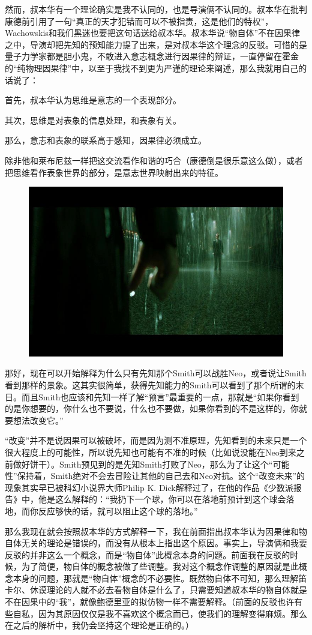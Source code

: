 \documentclass[UTF8]{ctexart}
\begin{document}
然而，叔本华有一个理论确实是我不认同的，也是导演俩不认同的。叔本华在批判康德前引用了一句“真正的天才犯错而可以不被指责，这是他们的特权”，Wachowskis和我们黑迷也要把这句话送给叔本华。叔本华说“物自体”不在因果律之中，导演却把先知的预知能力提了出来，是对叔本华这个理念的反驳。可惜的是量子力学家都是胆小鬼，不敢进入意志概念进行因果律的辩证，一直停留在霍金的“纯物理因果律”中，以至于我找不到更为严谨的理论来阐述，那么我就用自己的话说了：

首先，叔本华认为思维是意志的一个表现部分。

其次，思维是对表象的信息处理，和表象有关。

那么，意志和表象的联系高于感知，因果律必须成立。

除非他和莱布尼兹一样把这交流看作和谐的巧合（康德倒是很乐意这么做），或者把思维看作表象世界的部分，是意志世界映射出来的特征。

\begin{figure}[htb]
\centering
\includegraphics[width=0.5\linewidth]{fig/bbbfa2ccb58aa91101e928d3.jpg}
\end{figure}

那好，现在可以开始解释为什么只有先知那个Smith可以战胜Neo，或者说让Smith看到那样的景象。这其实很简单，获得先知能力的Smith可以看到了那个所谓的末日。而且Smith也应该和先知一样了解“预言”最重要的一点，那就是“如果你看到的是你想要的，你什么也不要说，什么也不要做，如果你看到的不是这样的，你就要想法改变它。”

“改变”并不是说因果可以被破坏，而是因为测不准原理，先知看到的未来只是一个很大程度上的可能性，所以说先知也可能有不准的时候（比如说没能在Neo到来之前做好饼干）。Smith预见到的是先知Smith打败了Neo，那么为了让这个“可能性”保持着，Smith绝对不会去冒险让其他的自己去和Neo对抗。这个“改变未来”的现象其实早已被科幻小说界大师Philip K. Dick解释过了，在他的作品《少数派报告》中，他是这么解释的：“我扔下一个球，你可以在落地前预计到这个球会落地，而你反应够快的话，就可以阻止这个球的落地。”

那么我现在就会按照叔本华的方式解释一下，我在前面指出叔本华认为因果律和物自体无关的理论是错误的，而没有从根本上指出这个原因。事实上，导演俩和我要反驳的并非这么一个概念，而是“物自体”此概念本身的问题。前面我在反驳的时候，为了简便，物自体的概念被做了些调整。我对这个概念作调整的原因就是此概念本身的问题，那就是“物自体”概念的不必要性。既然物自体不可知，那么理解笛卡尔、休谟理论的人就不必去看物自体是什么了，只需要知道叔本华的物自体就是不在因果中的“我”，就像鲍德里亚的拟仿物一样不需要解释。（前面的反驳也许有些自私，因为其原因仅仅是我不喜欢这个概念而已，使我们的理解变得麻烦。那么在之后的解析中，我仍会坚持这个理论是正确的。）
\end{document}
